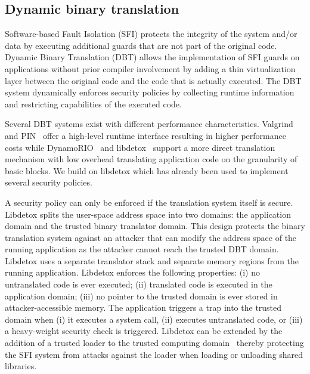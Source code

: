 \documentclass{acm_proc_article-sp}
\begin{document}
\subsection{Dynamic binary translation}


Software-based Fault Isolation (SFI) protects the integrity of the system
and/or data by executing additional guards that are not part of the original
code. Dynamic Binary Translation (DBT) allows the implementation of SFI guards on
applications without prior compiler involvement by adding a thin virtualization
layer between the original code and the code that is actually executed. The DBT
system dynamically enforces security policies by collecting runtime information
and restricting capabilities of the executed code.



Several DBT systems exist with different performance characteristics.
Valgrind~\cite{nethercote08valgrind} and PIN~\cite{luk05pldi} offer a high-level
runtime interface resulting in higher performance costs while
DynamoRIO~\cite{bruening03dynamorio} and libdetox~\cite{libdetox} support a more
direct translation mechanism with low overhead translating application code on
the granularity of basic blocks. We build on libdetox
which has already been used to implement several security policies.

A security policy can only be enforced if the translation system itself is
secure. Libdetox splits the user-space address space into two domains: the
application domain and the trusted binary translator domain.  This design
protects the binary translation system against an attacker that can modify the
address space of the running application as the attacker cannot reach the
trusted DBT domain.  Libdetox uses a separate translator stack and separate
memory regions from the running application.  Libdetox enforces the following
properties: (i) no untranslated code is ever executed; (ii) translated code is
executed in the application domain; (iii) no pointer to the trusted domain is
ever stored in attacker-accessible memory. The application triggers a trap into
the trusted domain when (i) it executes a system call, (ii) executes
untranslated code, or (iii) a heavy-weight security check is triggered. Libdetox
can be extended by the addition of a trusted loader to the trusted computing
domain~\cite{secuLoader} thereby protecting the SFI system from attacks against
the loader when loading or unloading shared libraries.
\end{document}
